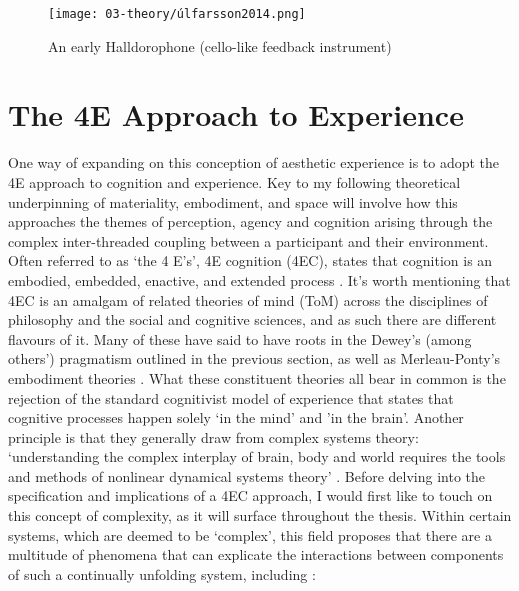 \begin{figure}[h]
    \centering
    \texttt{[image: 03-theory/úlfarsson2014.png]}
    \captionsetup{justification=centering,margin=1.5cm}
    \caption{An early Halldorophone (cello-like feedback instrument) \citep[from][]{ulfarsson2014}}\label{fig: ulfarsson2014}
\end{figure}

\section{The 4E Approach to Experience}\label{sec: theory-4e}
One way of expanding on this conception of aesthetic experience is to adopt the 4E approach to cognition and experience. Key to my following theoretical underpinning of materiality, embodiment, and space will involve how this approaches the themes of perception, agency and cognition arising through the complex inter-threaded coupling between a participant and their environment. Often referred to as `the 4 E's', 4E cognition (4EC), states that cognition is an embodied, embedded, enactive, and extended process \citep{gallagher2017}. It's worth mentioning that 4EC is an amalgam of related theories of mind (ToM) across the disciplines of philosophy and the social and cognitive sciences, and as such there are different flavours of it. Many of these have said to have roots in the Dewey's (among others') pragmatism outlined in the previous section, as well as Merleau-Ponty's embodiment theories \citep{zavota2016}. What these constituent theories all bear in common is the rejection of the standard cognitivist model of experience that states that cognitive processes happen solely `in the mind' and 'in the brain'. Another principle is that they generally draw from complex systems theory: `understanding the complex interplay of brain, body and world requires the tools and methods of nonlinear dynamical systems theory' \citep{clark1999}. Before delving into the specification and implications of a 4EC approach, I would first like to touch on this concept of complexity, as it will surface throughout the thesis. Within certain systems, which are deemed to be `complex', this field proposes that there are a multitude of phenomena that can explicate the interactions between components of such a continually unfolding system, including \citep{dedomenico2019}:
